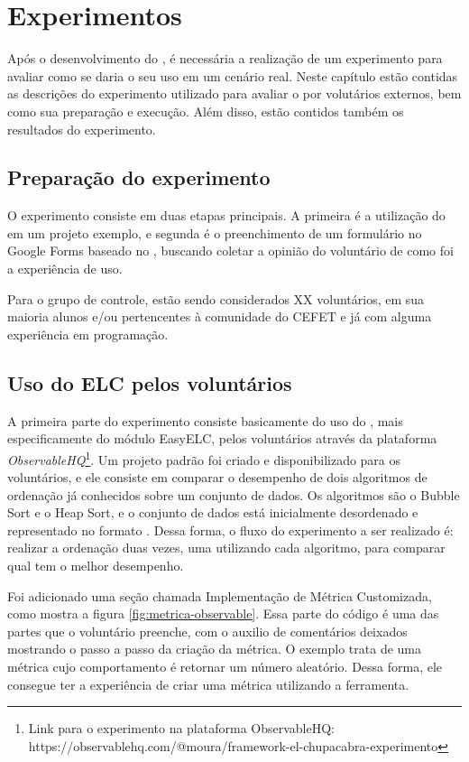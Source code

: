 \documentclass[12pt]{tcc}
\begin{document}
\chapter{Experimentos}
\label{cap:experimentos}

Após o desenvolvimento do , é necessária a realização de um experimento para avaliar como se daria o seu uso em um cenário real. Neste capítulo estão contidas as descrições do experimento utilizado para avaliar o  por volutários externos, bem como sua preparação e execução. Além disso, estão contidos também os resultados do experimento.

\section{Preparação do experimento}
\label{section:preparacao-experimento}

O experimento consiste em duas etapas principais. A primeira é a utilização do  em um projeto exemplo, e segunda é o preenchimento de um formulário no Google Forms baseado no , buscando coletar a opinião do voluntário de como foi a experiência de uso.

Para o grupo de controle, estão sendo considerados XX voluntários, em sua maioria alunos e/ou pertencentes à comunidade do CEFET e já com alguma experiência em programação. 

\section{Uso do ELC pelos voluntários}
\label{section:parte-1-experimento}

A primeira parte do experimento consiste basicamente do uso do , mais especificamente do módulo EasyELC, pelos voluntários através da plataforma \emph{ObservableHQ}\footnote{Link para o experimento na plataforma ObservableHQ: https://observablehq.com/@moura/framework-el-chupacabra-experimento}. Um projeto padrão foi criado e disponibilizado para os voluntários, e ele consiste em comparar o desempenho de dois algoritmos de ordenação já conhecidos sobre um conjunto de dados. Os algoritmos são o Bubble Sort e o Heap Sort, e o conjunto de dados está inicialmente desordenado e representado no formato . Dessa forma, o fluxo do experimento a ser realizado é: realizar a ordenação duas vezes, uma utilizando cada algoritmo, para comparar qual tem o melhor desempenho.

Foi adicionado uma seção chamada Implementação de Métrica Customizada, como mostra a figura \ref{fig:metrica-observable}. Essa parte do código é uma das partes que o voluntário preenche, com o auxilio de comentários deixados mostrando o passo a passo da criação da métrica. O exemplo trata de uma métrica cujo comportamento é retornar um número aleatório. Dessa forma, ele consegue ter a experiência de criar uma métrica utilizando a ferramenta.
\end{document}
